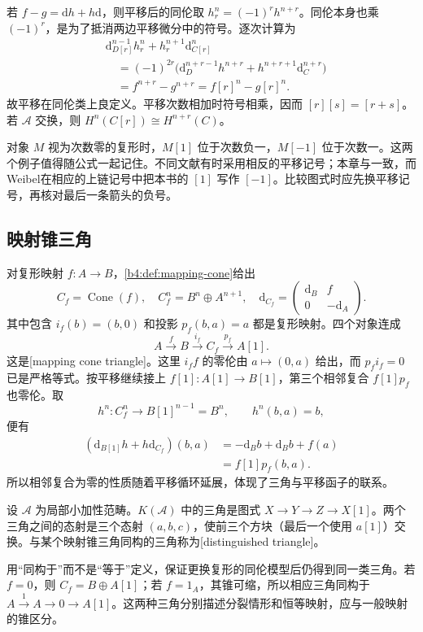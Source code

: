若 \(f-g=\mathrm{d}h+h\mathrm{d}\)，则平移后的同伦取 \(h_r^n=(-1)^r h^{n+r}\)。同伦本身也乘 \((-1)^r\)，是为了抵消两边平移微分中的符号。逐次计算为
\[
	\begin{aligned}
		&\mathrm{d}_{D[r]}^{n-1}h_r^n+h_r^{n+1}\mathrm{d}_{C[r]}^n\\
		&\quad=(-1)^{2r}\bigl(\mathrm{d}_D^{n+r-1}h^{n+r} +h^{n+r+1}\mathrm{d}_C^{n+r}\bigr)\\
		&\quad=f^{n+r}-g^{n+r}=f[r]^n-g[r]^n.
	\end{aligned}
\]
故平移在同伦类上良定义。平移次数相加时符号相乘，因而 \([r][s]=[r+s]\)。若 \(\mathcal A\) 交换，则 \(H^n(C[r])\cong H^{n+r}(C)\)。

\ProseParagraphBreak
对象 \(M\) 视为次数零的复形时，\(M[1]\) 位于次数负一，\(M[-1]\) 位于次数一。这两个例子值得随公式一起记住。不同文献有时采用相反的平移记号；本章与一致，而 Weibel\cite[Sections 10.1--10.2]{Weibel1994HomologicalAlgebra}在相应的上链记号中把本书的 \([1]\) 写作 \([-1]\)。比较图式时应先换平移记号，再核对最后一条箭头的负号。

\subsection{映射锥三角}
\label{b4:subsec:1601:03}

对复形映射 \(f:A\to B\)，\cref{b4:def:mapping-cone}给出
\[
	C_f=\operatorname{Cone}(f),\quad C_f^n=B^n\oplus A^{n+1},\quad
	\mathrm{d}_{C_f}=\begin{pmatrix}\mathrm{d}_B&f\\0&-\mathrm{d}_A\end{pmatrix}.
\]
其中包含 \(i_f(b)=(b,0)\) 和投影 \(p_f(b,a)=a\) 都是复形映射。四个对象连成
\[
	A\xrightarrow{f}B\xrightarrow{i_f}C_f\xrightarrow{p_f}A[1].
\]
这是[mapping cone triangle]。这里 \(i_ff\) 的零伦由 \(a\mapsto(0,a)\) 给出，而 \(p_fi_f=0\) 已是严格等式。按平移继续接上 \(f[1]:A[1]\to B[1]\)，第三个相邻复合 \(f[1]p_f\) 也零伦。取
\[
	h^n:C_f^n\longrightarrow B[1]^{n-1}=B^n, \qquad h^n(b,a)=b,
\]
便有
\[
	\begin{aligned}
		(\mathrm{d}_{B[1]}h+h\mathrm{d}_{C_f})(b,a) &=-\mathrm{d}_Bb+\mathrm{d}_Bb+f(a)\\
		&=f[1]p_f(b,a).
	\end{aligned}
\]
所以相邻复合为零的性质随着平移循环延展，体现了三角与平移函子的联系。

\begin{definition}\label{b4:def:good-cone-triangle}
	设 \(\mathcal A\) 为局部小加性范畴。\(K(\mathcal A)\) 中的三角是图式 \(X\to Y\to Z\to X[1]\)。两个三角之间的态射是三个态射 \((a,b,c)\)，使前三个方块（最后一个使用 \(a[1]\)）交换。与某个映射锥三角同构的三角称为[distinguished triangle]。
\end{definition}

用“同构于”而不是“等于”定义，保证更换复形的同伦模型后仍得到同一类三角。若 \(f=0\)，则 \(C_f=B\oplus A[1]\)；若 \(f=1_A\)，其锥可缩，所以相应三角同构于 \(A\xrightarrow{1}A\to0\to A[1]\)。这两种三角分别描述分裂情形和恒等映射，应与一般映射的锥区分。

